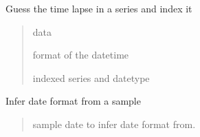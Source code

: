 \documentclass[letterpaper,10pt,english]{sphinxmanual}
\begin{document}
\begin{fulllineitems}
\label{\detokenize{source/chowclassifier:chowclassifier.chow.guess_timelapse_type}}
\pysigstartsignatures
{}
\pysigstopsignatures
\sphinxAtStartPar
Guess the time lapse in a series and index it
\begin{quote}\begin{description}
\sphinxAtStartPar
data

\sphinxAtStartPar
format of the datetime

\sphinxAtStartPar
indexed series and datetype

\end{description}\end{quote}

\end{fulllineitems}


\begin{fulllineitems}
\label{\detokenize{source/chowclassifier:chowclassifier.chow.infer_date_format}}
\pysigstartsignatures
{}
\pysigstopsignatures
\sphinxAtStartPar
Infer date format from a sample
\begin{quote}\begin{description}
\sphinxAtStartPar
sample date to infer date format from.

\end{description}\end{quote}

\end{fulllineitems}
\end{document}
